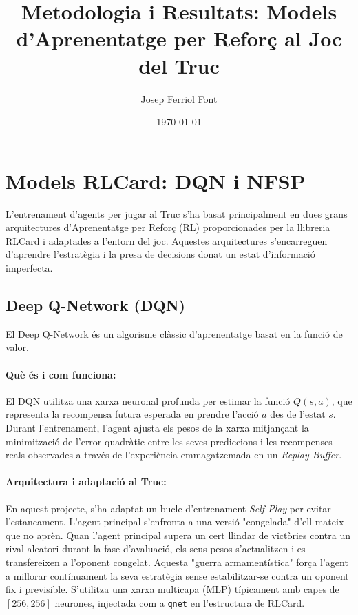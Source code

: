 \documentclass[a4paper,11pt]{article}
\title{Metodologia i Resultats: Models d'Aprenentatge per Reforç al Joc del Truc}
\author{Josep Ferriol Font}
\date{\today}
\begin{document}
\maketitle
\tableofcontents
\newpage

\section{Models RLCard: DQN i NFSP}
L'entrenament d'agents per jugar al Truc s'ha basat principalment en dues grans arquitectures d'Aprenentatge per Reforç (RL) proporcionades per la llibreria RLCard i adaptades a l'entorn del joc. Aquestes arquitectures s'encarreguen d'aprendre l'estratègia i la presa de decisions donat un estat d'informació imperfecta.

\subsection{Deep Q-Network (DQN)}
El Deep Q-Network és un algorisme clàssic d'aprenentatge basat en la funció de valor.
\paragraph{Què és i com funciona:}
El DQN utilitza una xarxa neuronal profunda per estimar la funció $Q(s, a)$, que representa la recompensa futura esperada en prendre l'acció $a$ des de l'estat $s$. Durant l'entrenament, l'agent ajusta els pesos de la xarxa mitjançant la minimització de l'error quadràtic entre les seves prediccions i les recompenses reals observades a través de l'experiència emmagatzemada en un \textit{Replay Buffer}.

\paragraph{Arquitectura i adaptació al Truc:}
En aquest projecte, s'ha adaptat un bucle d'entrenament \textit{Self-Play} per evitar l'estancament. L'agent principal s'enfronta a una versió "congelada" d'ell mateix que no aprèn. Quan l'agent principal supera un cert llindar de victòries contra un rival aleatori durant la fase d'avaluació, els seus pesos s'actualitzen i es transfereixen a l'oponent congelat. Aquesta "guerra armamentística" força l'agent a millorar contínuament la seva estratègia sense estabilitzar-se contra un oponent fix i previsible. S'utilitza una xarxa multicapa (MLP) típicament amb capes de $[256, 256]$ neurones, injectada com a \texttt{qnet} en l'estructura de RLCard.
\end{document}
